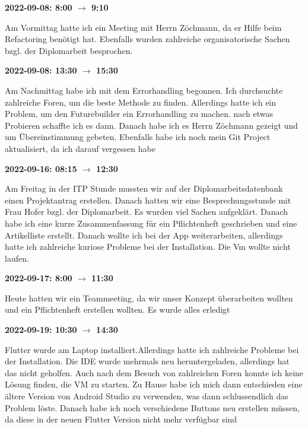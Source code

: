 \vspace{0.5cm} \textbf{2022-09-08: 8:00 $\rightarrow$ 9:10}

Am Vormittag hatte ich ein Meeting mit Herrn Zöchmann, da er Hilfe beim
Refactoring benötigt hat. Ebenfalls wurden zahlreiche organisatorische
Sachen bzgl. der Diplomarbeit besprochen.

\vspace{0.5cm} \textbf{2022-09-08: 13:30 $\rightarrow$ 15:30}

Am Nachmittag habe ich mit dem Errorhandling begonnen. Ich durchsuchte
zahlreiche Foren, um die beste Methode zu finden. Allerdings hatte ich ein
Problem, um den Futurebuilder ein Errorhandling zu machen. nach
etwas Probieren schaffte ich es dann. Danach habe ich es Herrn Zöchmann
gezeigt und um Übereinstimmung gebeten. Ebenfalls habe ich noch mein
Git Project aktualisiert, da ich darauf vergessen habe

\vspace{0.5cm} \textbf{2022-09-16: 08:15 $\rightarrow$ 12:30}

Am Freitag in der ITP Stunde mussten wir auf der Diplomarbeitsdatenbank
einen Projektantrag erstellen. Danach hatten wir eine Besprechungsstunde
mit Frau Hofer bzgl. der Diplomarbeit. Es wurden viel Sachen
aufgeklärt. Danach habe ich eine kurze Zusammenfassung für ein
Pflichtenheft geschrieben und eine Artikelliste erstellt. Danach wollte
ich bei der App weiterarbeiten, allerdings hatte ich zahlreiche kuriose
Probleme bei der Installation. Die Vm wollte nicht laufen.

\vspace{0.5cm} \textbf{2022-09-17: 8:00 $\rightarrow$ 11:30} 

Heute hatten wir ein
Teammeeting, da wir unser Konzept überarbeiten wollten und ein
Pflichtenheft erstellen wollten. Es wurde alles erledigt

\vspace{0.5cm} \textbf{2022-09-19: 10:30 $\rightarrow$ 14:30} 

Flutter wurde am Laptop installiert.Allerdings hatte ich zahlreiche Probleme bei der Installation. Die IDE wurde mehrmals neu
heruntergeladen, allerdings hat das nicht geholfen. Auch nach dem Besuch
von zahlreichen Foren konnte ich keine Lösung finden, die VM zu
starten. Zu Hause habe ich mich dann entschieden eine ältere Version von
Android Studio zu verwenden, was dann schlussendlich das Problem löste.
Danach habe ich noch verschiedene Buttons neu erstellen müssen, da diese
in der neuen Flutter Version nicht mehr verfügbar sind

